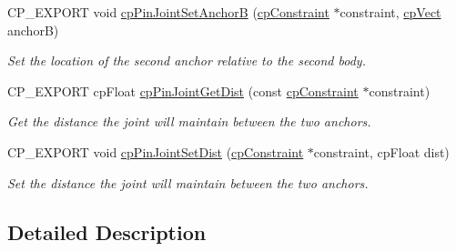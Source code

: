 \begin{DoxyCompactItemize}
C\+P\+\_\+\+E\+X\+P\+O\+RT void \hyperlink{group__cpPinJoint_ga70254f1f1e082f55544ae29593a37b6b}{cp\+Pin\+Joint\+Set\+AnchorB} (\hyperlink{structcpConstraint}{cp\+Constraint} $\ast$constraint, \hyperlink{structcpVect}{cp\+Vect} anchorB)
\begin{DoxyCompactList}\small\item\em Set the location of the second anchor relative to the second body. \end{DoxyCompactList}\item 
\mbox{\label{group__cpPinJoint_ga65f2f893e5949242075cf2e0c17874dd}} 
C\+P\+\_\+\+E\+X\+P\+O\+RT cp\+Float \hyperlink{group__cpPinJoint_ga65f2f893e5949242075cf2e0c17874dd}{cp\+Pin\+Joint\+Get\+Dist} (const \hyperlink{structcpConstraint}{cp\+Constraint} $\ast$constraint)
\begin{DoxyCompactList}\small\item\em Get the distance the joint will maintain between the two anchors. \end{DoxyCompactList}\item 
\mbox{\label{group__cpPinJoint_gaa83a79c929128035c6d47125d60f797b}} 
C\+P\+\_\+\+E\+X\+P\+O\+RT void \hyperlink{group__cpPinJoint_gaa83a79c929128035c6d47125d60f797b}{cp\+Pin\+Joint\+Set\+Dist} (\hyperlink{structcpConstraint}{cp\+Constraint} $\ast$constraint, cp\+Float dist)
\begin{DoxyCompactList}\small\item\em Set the distance the joint will maintain between the two anchors. \end{DoxyCompactList}\end{DoxyCompactItemize}


\subsection{Detailed Description}
